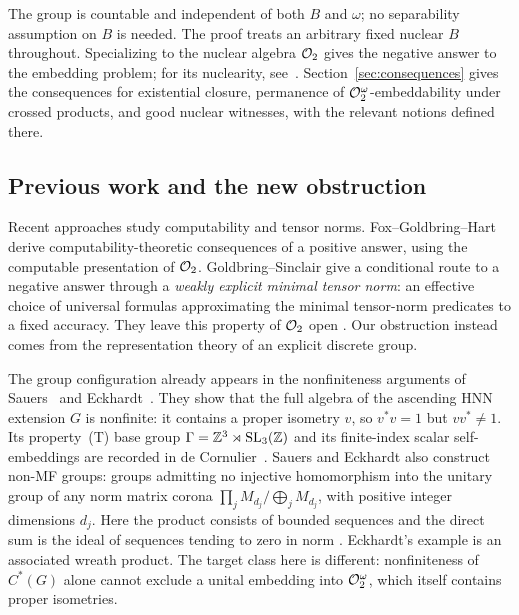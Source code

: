 The group is countable and independent of both $B$ and $\omega$;
no separability assumption on $B$ is needed.
The proof treats an arbitrary fixed nuclear $B$ throughout. Specializing
to the nuclear algebra $\mathcal O_2$ gives the negative answer to the embedding
problem; for its nuclearity, see~\cite[Section~4, pp.~80--82]{PaulsenZheng2016}.
Section~\ref{sec:consequences} gives the consequences for existential
closure, permanence of $\mathcal O_2^\omega$-embeddability under crossed products,
and good nuclear witnesses, with the relevant notions defined there.

\subsection{Previous work and the new obstruction}

\begingroup
\setlength{\emergencystretch}{2em}
Recent approaches study computability and tensor norms.
Fox--Goldbring--Hart~\cite{FoxGoldbringHart2024} derive
computability-theoretic consequences of a positive answer, using the
computable presentation of $\mathcal O_2$. Goldbring--Sinclair give a conditional
route to a negative answer through a \emph{weakly explicit minimal tensor
norm}: an effective choice of universal formulas approximating the
minimal tensor-norm predicates to a fixed accuracy.
They leave this property of $\mathcal O_2$ open
\cite[Definition~4.16, Theorem~4.18 and Question~4.20]{GoldbringSinclair2025Tensor}.
Our obstruction instead comes from the representation theory of an
explicit discrete group.\par
\endgroup

The group configuration already appears in the nonfiniteness arguments of
Sauers~\cite[Section~2.4]{Sauers2026NonMF} and
Eckhardt~\cite[Theorem~3.1 and Example~3.2]{Eckhardt2026}.
They show that the full algebra of the ascending HNN extension $G$ is
nonfinite: it contains a proper isometry $v$, so $v^*v=1$ but $vv^*\ne1$.
Its property~(T) base group
$\Gamma=\mathbb Z^3\rtimes\operatorname{SL}_3(\mathbb Z)$ and its finite-index scalar
self-embeddings are recorded in
de Cornulier~\cite[Proposition~1.1 and its proof]{deCornulier2007}.
Sauers and Eckhardt also construct non-MF groups: groups admitting no injective
homomorphism into the unitary group of any norm matrix corona
$\prod_j M_{d_j}/\bigoplus_j M_{d_j}$, with positive integer dimensions
$d_j$. Here the product consists of bounded sequences and the direct sum
is the ideal of sequences tending to zero in norm
\cite[Theorem~4.3]{Eckhardt2026}\cite[Sections~3--5]{Sauers2026NonMF}.
Eckhardt's example is an associated wreath product. The target class here is different:
nonfiniteness of $C^*(G)$ alone cannot exclude a unital embedding into
$\mathcal O_2^\omega$, which itself contains proper isometries.

